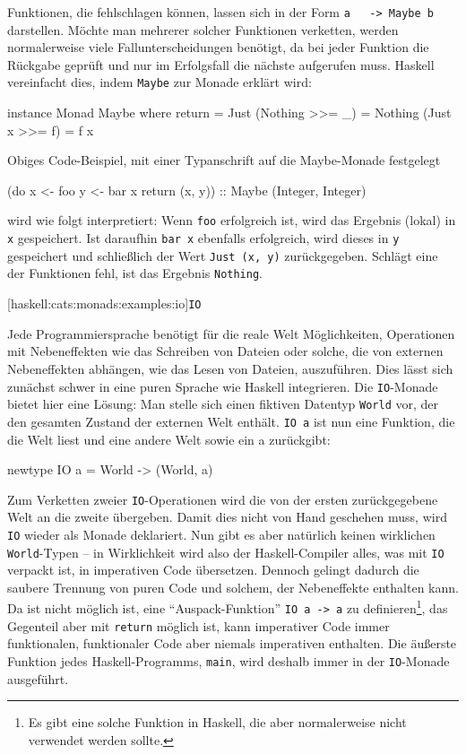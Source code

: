 \documentclass[11pt, a4paper, bibgerm]{scrbook}
\newenvironment{DIFnomarkup}{}{}
\newcommand\icode[1]{\lstinline?#1?}
\newcommand\lparagraph{}
\begin{document}
Funktionen, die fehlschlagen können, lassen sich in der Form \icode{a
  -> Maybe b} darstellen. Möchte man mehrerer solcher Funktionen
verketten, werden normalerweise viele Fallunterscheidungen benötigt, da
bei jeder Funktion die Rückgabe geprüft und nur im Erfolgsfall die
nächste aufgerufen muss. Haskell vereinfacht dies, indem \icode{Maybe}
zur Monade erklärt wird:
\begin{DIFnomarkup}\begin{code}
instance Monad Maybe
  where return = Just
        (Nothing >>= _) = Nothing
        (Just x  >>= f) = f x
\end{code}\end{DIFnomarkup} %
Obiges Code-Beispiel, mit einer Typanschrift auf die Maybe-Monade
festgelegt 
\begin{DIFnomarkup}\begin{code}
(do x <- foo
    y <- bar x
    return (x, y)) :: Maybe (Integer, Integer)
\end{code}\end{DIFnomarkup}
wird wie folgt interpretiert: Wenn \icode{foo} erfolgreich ist, wird das
Ergebnis (lokal) in \icode{x} gespeichert. Ist daraufhin \icode{bar x}
ebenfalls erfolgreich, wird dieses in \icode{y} gespeichert und
schließlich der Wert \icode{Just (x, y)} zurückgegeben. Schlägt eine der
Funktionen fehl, ist das Ergebnis \icode{Nothing}.

\lparagraph[haskell:cats:monads:examples:io]{\icode{IO}}

Jede Programmiersprache benötigt für die reale Welt Möglichkeiten,
Operationen mit Nebeneffekten wie das Schreiben von Dateien oder solche,
die von externen Nebeneffekten abhängen, wie das Lesen von Dateien,
auszuführen. Dies lässt sich zunächst schwer in eine puren Sprache wie
Haskell integrieren. Die \icode{IO}-Monade bietet hier eine Lösung: Man
stelle sich einen fiktiven Datentyp \icode{World} vor, der den gesamten
Zustand der externen Welt enthält. \icode{IO a} ist nun eine Funktion,
die die Welt liest und eine andere Welt sowie ein a zurückgibt:
\begin{DIFnomarkup}\begin{code}
newtype IO a = World -> (World, a)
\end{code}\end{DIFnomarkup}
Zum Verketten zweier \icode{IO}-Operationen wird die von der ersten
zurückgegebene Welt an die zweite übergeben. Damit dies nicht von Hand
geschehen muss, wird \icode{IO} wieder als Monade deklariert. Nun gibt
es aber natürlich keinen wirklichen \icode{World}-Typen -- in
Wirklichkeit wird also der Haskell-Compiler alles, was mit \icode{IO}
verpackt ist, in imperativen Code übersetzen. Dennoch gelingt dadurch
die saubere Trennung von puren Code und solchem, der Nebeneffekte
enthalten kann. Da ist nicht möglich ist, eine "`Auspack-Funktion"'
\icode{IO a -> a} zu definieren\footnote{Es gibt eine solche Funktion in
  Haskell, die aber normalerweise nicht verwendet werden sollte.}, das
Gegenteil aber mit \icode{return} möglich ist, kann imperativer Code
immer funktionalen, funktionaler Code aber niemals imperativen
enthalten. Die äußerste Funktion jedes Haskell-Programms, \icode{main},
wird deshalb immer in der \icode{IO}-Monade ausgeführt.
\end{document}
